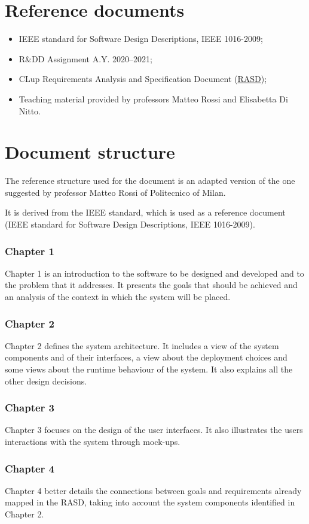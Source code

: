 \documentclass[a4paper,oneside,11pt]{book}
\begin{document}
    
    \section{Reference documents}
    \begin{itemize}
        \item IEEE standard for Software Design Descriptions, IEEE 1016-2009;
        \item R\&DD Assignment A.Y. 2020--2021;
        \item CLup Requirements Analysis and Specification Document (\href{run:../DeliveryFolder/RASD2.pdf}{RASD});
        \item Teaching material provided by professors Matteo Rossi and Elisabetta Di Nitto.
    \end{itemize}

    \section{Document structure}
    The reference structure used for the document is an adapted version of the one suggested by professor Matteo Rossi of Politecnico of Milan. \par It is derived from the IEEE standard, which is used as a reference document (IEEE standard for Software Design Descriptions, IEEE 1016-2009).
    \subsubsection{Chapter 1} 
    Chapter 1 is an introduction to the software to be designed and developed and to the problem that it addresses. It presents the goals that should be achieved and an analysis of the context in which the system will be placed.
    \subsubsection{Chapter 2} 
    Chapter 2 defines the system architecture. It includes a view of the system components and of their interfaces, a view about the deployment choices and some views about the runtime behaviour of the system. It also explains all the other design decisions.
    \subsubsection{Chapter 3} 
    Chapter 3 focuses on the design of the user interfaces. It also illustrates the users interactions with the system through mock-ups.
    \subsubsection{Chapter 4} 
    Chapter 4 better details the connections between goals and requirements already mapped in the RASD, taking into account the system components identified in Chapter 2.
\end{document}
